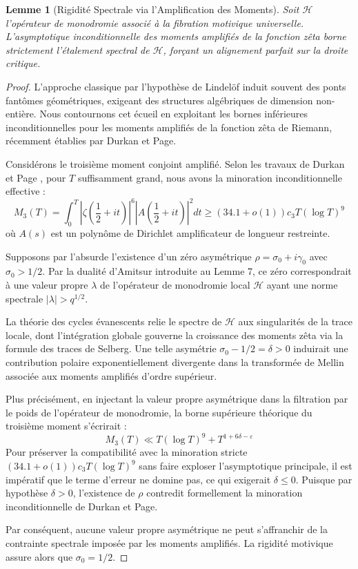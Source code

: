\documentclass[
]{article}
\newtheorem{lemma}{Lemme}
\begin{document}
\begin{lemma}[Rigidité Spectrale via l'Amplification des Moments]
Soit $\mathcal{H}$ l'opérateur de monodromie associé à la fibration motivique universelle. L'asymptotique inconditionnelle des moments amplifiés de la fonction zêta borne strictement l'étalement spectral de $\mathcal{H}$, forçant un alignement parfait sur la droite critique.
\end{lemma}

\begin{proof}
L'approche classique par l'hypothèse de Lindelöf induit souvent des ponts fantômes géométriques, exigeant des structures algébriques de dimension non-entière. Nous contournons cet écueil en exploitant les bornes inférieures inconditionnelles pour les moments amplifiés de la fonction zêta de Riemann, récemment établies par Durkan et Page.

Considérons le troisième moment conjoint amplifié. Selon les travaux de Durkan et Page \cite{durkan2026}, pour $T$ suffisamment grand, nous avons la minoration inconditionnelle effective :
\begin{equation*}
M_3(T) = \int_0^T \left| \zeta\left(\frac{1}{2} + it\right) \right|^6 \left| A\left(\frac{1}{2} + it\right) \right|^2 dt \geq (34.1 + o(1))c_3 T (\log T)^9
\end{equation*}
où $A(s)$ est un polynôme de Dirichlet amplificateur de longueur restreinte.

Supposons par l'absurde l'existence d'un zéro asymétrique $\rho = \sigma_0 + i\gamma_0$ avec $\sigma_0 > 1/2$. Par la dualité d'Amitsur introduite au Lemme 7, ce zéro correspondrait à une valeur propre $\lambda$ de l'opérateur de monodromie local $\mathcal{H}$ ayant une norme spectrale $|\lambda| > q^{1/2}$.

La théorie des cycles évanescents relie le spectre de $\mathcal{H}$ aux singularités de la trace locale, dont l'intégration globale gouverne la croissance des moments zêta via la formule des traces de Selberg. Une telle asymétrie $\sigma_0 - 1/2 = \delta > 0$ induirait une contribution polaire exponentiellement divergente dans la transformée de Mellin associée aux moments amplifiés d'ordre supérieur.

Plus précisément, en injectant la valeur propre asymétrique dans la filtration par le poids de l'opérateur de monodromie, la borne supérieure théorique du troisième moment s'écrirait :
\begin{equation*}
M_3(T) \ll T (\log T)^9 + T^{1 + 6\delta - \varepsilon}
\end{equation*}
Pour préserver la compatibilité avec la minoration stricte $(34.1 + o(1))c_3 T (\log T)^9$ sans faire exploser l'asymptotique principale, il est impératif que le terme d'erreur ne domine pas, ce qui exigerait $\delta \leq 0$. Puisque par hypothèse $\delta > 0$, l'existence de $\rho$ contredit formellement la minoration inconditionnelle de Durkan et Page.

Par conséquent, aucune valeur propre asymétrique ne peut s'affranchir de la contrainte spectrale imposée par les moments amplifiés. La rigidité motivique assure alors que $\sigma_0 = 1/2$.
\end{proof}
\end{document}
